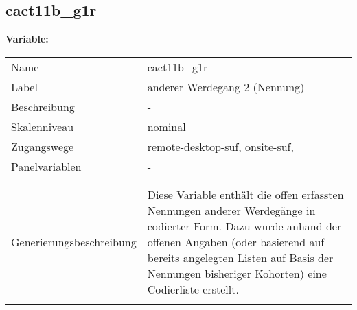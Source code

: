 	
	
	\subsection{cact11b\_g1r}
	\label{subSection:cact11b_g1r}

	\noindent\textbf{Variable:}\\
		\begin{tabular}{lL{11.3cm}}
			\label{tableVariable:cact11b_g1r}
			Name & cact11b\_g1r \\
			Label & anderer Werdegang 2 (Nennung)  \\
			Beschreibung & - \\
			Skalenniveau & nominal \\
			Zugangswege &
				remote-desktop-suf,
				onsite-suf,
 \\
			Panelvariablen & -
			 \\
			 \\
 \\
					Generierungsbeschreibung & Diese Variable enthält die offen erfassten Nennungen anderer Werdegänge in codierter Form. Dazu wurde anhand der offenen Angaben (oder basierend auf bereits angelegten Listen auf Basis der Nennungen bisheriger Kohorten) eine Codierliste erstellt.
				 \\	
			 \\
		\end{tabular}






